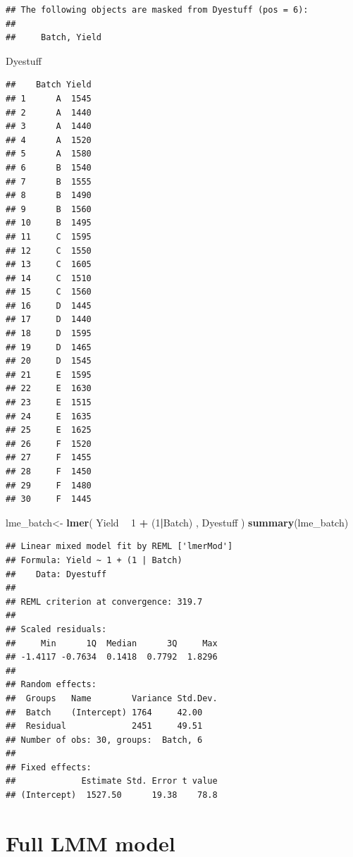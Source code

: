 \documentclass[]{book}
\newenvironment{Shaded}{\begin{snugshade}}{\end{snugshade}}
\newcommand{\DecValTok}[1]{\textcolor[rgb]{0.00,0.00,0.81}{#1}}
\newcommand{\KeywordTok}[1]{\textcolor[rgb]{0.13,0.29,0.53}{\textbf{#1}}}
\newcommand{\NormalTok}[1]{#1}
\newcommand{\OperatorTok}[1]{\textcolor[rgb]{0.81,0.36,0.00}{\textbf{#1}}}
\newcommand{\StringTok}[1]{\textcolor[rgb]{0.31,0.60,0.02}{#1}}
\begin{document}
\begin{verbatim}
## The following objects are masked from Dyestuff (pos = 6):
## 
##     Batch, Yield
\end{verbatim}

\begin{Shaded}
\begin{Highlighting}[]
\NormalTok{Dyestuff}
\end{Highlighting}
\end{Shaded}

\begin{verbatim}
##    Batch Yield
## 1      A  1545
## 2      A  1440
## 3      A  1440
## 4      A  1520
## 5      A  1580
## 6      B  1540
## 7      B  1555
## 8      B  1490
## 9      B  1560
## 10     B  1495
## 11     C  1595
## 12     C  1550
## 13     C  1605
## 14     C  1510
## 15     C  1560
## 16     D  1445
## 17     D  1440
## 18     D  1595
## 19     D  1465
## 20     D  1545
## 21     E  1595
## 22     E  1630
## 23     E  1515
## 24     E  1635
## 25     E  1625
## 26     F  1520
## 27     F  1455
## 28     F  1450
## 29     F  1480
## 30     F  1445
\end{verbatim}

\begin{Shaded}
\begin{Highlighting}[]
\NormalTok{lme_batch<-}\StringTok{ }\KeywordTok{lmer}\NormalTok{( Yield }\OperatorTok{~}\StringTok{ }\DecValTok{1} \OperatorTok{+}\StringTok{ }\NormalTok{(}\DecValTok{1}\OperatorTok{|}\NormalTok{Batch)  , Dyestuff )}
\KeywordTok{summary}\NormalTok{(lme_batch)}
\end{Highlighting}
\end{Shaded}

\begin{verbatim}
## Linear mixed model fit by REML ['lmerMod']
## Formula: Yield ~ 1 + (1 | Batch)
##    Data: Dyestuff
## 
## REML criterion at convergence: 319.7
## 
## Scaled residuals: 
##     Min      1Q  Median      3Q     Max 
## -1.4117 -0.7634  0.1418  0.7792  1.8296 
## 
## Random effects:
##  Groups   Name        Variance Std.Dev.
##  Batch    (Intercept) 1764     42.00   
##  Residual             2451     49.51   
## Number of obs: 30, groups:  Batch, 6
## 
## Fixed effects:
##             Estimate Std. Error t value
## (Intercept)  1527.50      19.38    78.8
\end{verbatim}

\hypertarget{full-lmm-model}{%
\section{Full LMM model}\label{full-lmm-model}}
\end{document}
